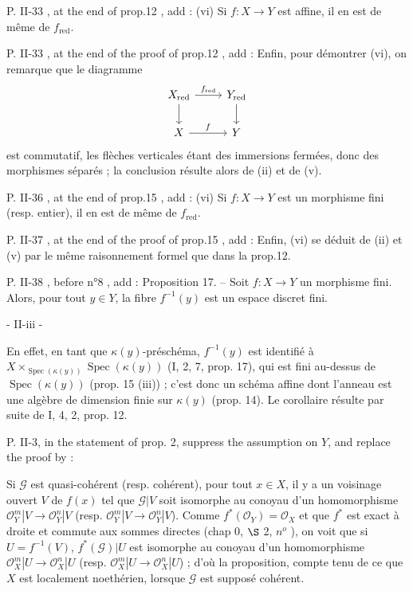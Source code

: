 P. II-33 , at the end of prop.12 , add :
(vi) Si $f : X \to Y$ est affine, il en est de même de $f_{\operatorname{red}}$.

P. II-33 , at the end of the proof of prop.12 , add :
Enfin, pour démontrer (vi), on remarque que le diagramme
$$\begin{tikzcd}
X_{\operatorname{red}} \arrow[r, "f_{\operatorname{red}}"] \arrow[d] & Y_{\operatorname{red}} \arrow[d] \\
X \arrow[r, "f"] & Y
\end{tikzcd}$$
est commutatif, les flèches verticales étant des immersions fermées, donc des morphismes séparés ; la conclusion résulte alors de (ii) et de (v).

P. II-36 , at the end of prop.15 , add :
(vi) Si $f : X \to Y$ est un morphisme fini (resp. entier), il en est de même de $f_{\operatorname{red}}$.

P. II-37 , at the end of the proof of prop.15 , add :
Enfin, (vi) se déduit de (ii) et (v) par le même raisonnement formel que dans la prop.12.

P. II-38 , before n°8 , add :
Proposition 17. -- Soit $f : X \to Y$ un morphisme fini. Alors, pour tout $y \in Y$, la fibre $f^{-1}(y)$ est un espace discret fini.

\newpage


- II-iii -

En effet, en tant que $\kappa(y)$-préschéma, $f^{-1}(y)$ est identifié à $X \times_{\operatorname{Spec}(\kappa(y))} \operatorname{Spec}(\kappa(y))$ (I, 2, 7, prop. 17), qui est fini au-dessus de $\operatorname{Spec}(\kappa(y))$ (prop. 15 (iii)) ; c'est donc un schéma affine dont l'anneau est une algèbre de dimension finie sur $\kappa(y)$ (prop. 14). Le corollaire résulte par suite de I, 4, 2, prop. 12.

P. II-3, in the statement of prop. 2, suppress the assumption on $Y$, and replace the proof by :

Si $\mathcal{G}$ est quasi-cohérent (resp. cohérent), pour tout $x \in X$, il y a un voisinage ouvert $V$ de $f(x)$ tel que $\mathcal{G}|V$ soit isomorphe au conoyau d'un homomorphisme $\mathcal{O}_Y^m|V \to \mathcal{O}_Y^n|V$ (resp. $\mathcal{O}_Y^m|V \to \mathcal{O}_Y^n|V$). Comme $f^*(\mathcal{O}_Y) = \mathcal{O}_X$ et que $f^*$ est exact à droite et commute aux sommes directes (chap 0, $\S$ 2, $n^o$ ), on voit que si $U=f^{-1}(V)$, $f^*(\mathcal{G})|U$ est isomorphe au conoyau d'un homomorphisme $\mathcal{O}_X^m|U \to \mathcal{O}_X^n|U$ (resp. $\mathcal{O}_X^m|U \to \mathcal{O}_X^n|U$) ; d'où la proposition, compte tenu de ce que $X$ est localement noethérien, lorsque $\mathcal{G}$ est supposé cohérent.


